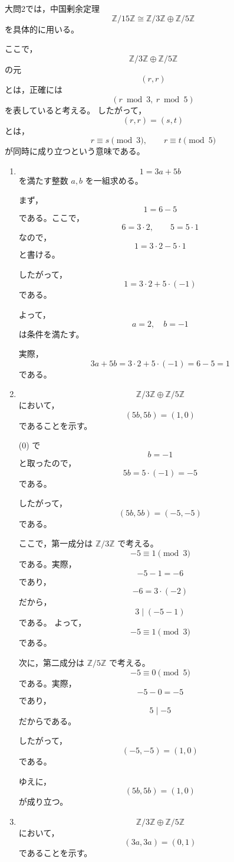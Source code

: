 
\begin{solution}
	大問2では，中国剰余定理
	\[
	\mathbb{Z}/15\mathbb{Z}
	\cong
	\mathbb{Z}/3\mathbb{Z}
	\oplus
	\mathbb{Z}/5\mathbb{Z}
	\]
	を具体的に用いる。
	
	ここで，
	\[
	\mathbb{Z}/3\mathbb{Z}
	\oplus
	\mathbb{Z}/5\mathbb{Z}
	\]
	の元
	\[
	(r,r)
	\]
	とは，正確には
	\[
	(r \bmod 3,\ r \bmod 5)
	\]
	を表していると考える。
	したがって，
	\[
	(r,r)=(s,t)
	\]
	とは，
	\[
	r\equiv s \pmod{3},
	\qquad
	r\equiv t \pmod{5}
	\]
	が同時に成り立つという意味である。
	
	\begin{enumerate}
		\item[(0)]
		\[
		1=3a+5b
		\]
		を満たす整数 \(a,b\) を一組求める。
		
		まず，
		\[
		1=6-5
		\]
		である。ここで，
		\[
		6=3\cdot 2,
		\qquad
		5=5\cdot 1
		\]
		なので，
		\[
		1=3\cdot 2-5\cdot 1
		\]
		と書ける。
		
		したがって，
		\[
		1=3\cdot 2+5\cdot(-1)
		\]
		である。
		
		よって，
		\[
		\boxed{
			a=2,\quad b=-1
		}
		\]
		は条件を満たす。
		
		実際，
		\[
		3a+5b
		=
		3\cdot 2+5\cdot(-1)
		=
		6-5
		=
		1
		\]
		である。
		
		\item[(1)]
		\[
		\mathbb{Z}/3\mathbb{Z}
		\oplus
		\mathbb{Z}/5\mathbb{Z}
		\]
		において，
		\[
		(5b,5b)=(1,0)
		\]
		であることを示す。
		
		(0) で
		\[
		b=-1
		\]
		と取ったので，
		\[
		5b=5\cdot(-1)=-5
		\]
		である。
		
		したがって，
		\[
		(5b,5b)=(-5,-5)
		\]
		である。
		
		ここで，第一成分は \(\mathbb{Z}/3\mathbb{Z}\) で考える。
		\[
		-5\equiv 1 \pmod{3}
		\]
		である。実際，
		\[
		-5-1=-6
		\]
		であり，
		\[
		-6=3\cdot(-2)
		\]
		だから，
		\[
		3\mid (-5-1)
		\]
		である。
		よって，
		\[
		-5\equiv 1\pmod{3}
		\]
		である。
		
		次に，第二成分は \(\mathbb{Z}/5\mathbb{Z}\) で考える。
		\[
		-5\equiv 0 \pmod{5}
		\]
		である。実際，
		\[
		-5-0=-5
		\]
		であり，
		\[
		5\mid -5
		\]
		だからである。
		
		したがって，
		\[
		(-5,-5)=(1,0)
		\]
		である。
		
		ゆえに，
		\[
		\boxed{
			(5b,5b)=(1,0)
		}
		\]
		が成り立つ。
		
		\item[(2)]
		\[
		\mathbb{Z}/3\mathbb{Z}
		\oplus
		\mathbb{Z}/5\mathbb{Z}
		\]
		において，
		\[
		(3a,3a)=(0,1)
		\]
		であることを示す。
		

\end{enumerate}
\end{solution}

